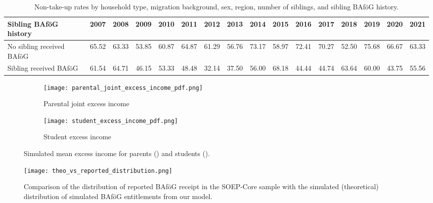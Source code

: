 \begin{landscape}
\begin{table}[htbp]
\begin{tabular}{lccccccccccccccc}
\midrule
Sibling BAföG history & 2007 & 2008 & 2009 & 2010 & 2011 & 2012 & 2013 & 2014 & 2015 & 2016 & 2017 & 2018 & 2019 & 2020 & 2021 \\
\midrule
No sibling received BAföG & 65.52 & 63.33 & 53.85 & 60.87 & 64.87 & 61.29 & 56.76 & 73.17 & 58.97 & 72.41 & 70.27 & 52.50 & 75.68 & 66.67 & 63.33 \\
Sibling received BAföG    & 61.54 & 64.71 & 46.15 & 53.33 & 48.48 & 32.14 & 37.50 & 56.00 & 68.18 & 44.44 & 44.74 & 63.64 & 60.00 & 43.75 & 55.56 \\
\bottomrule
\end{tabular}
\caption{Non-take-up rates by household type, migration background, sex, region, number of siblings, and sibling BAföG history.}
\end{table}
\end{landscape}


\begin{figure}[htbp]
  \centering
  \begin{subfigure}[t]{0.48\linewidth}
    \texttt{[image: parental\_joint\_excess\_income\_pdf.png]}
    \caption{Parental joint excess income}
    \label{fig:parental-excess}
  \end{subfigure}
  \hfill
  \begin{subfigure}[t]{0.48\linewidth}
    \texttt{[image: student\_excess\_income\_pdf.png]}
    \caption{Student excess income}
    \label{fig:student-excess}
  \end{subfigure}
  \caption{Simulated mean excess income for parents () and students ().}
  \label{fig:excess-income}
\end{figure}


\begin{figure}[htbp]
  \centering
  \texttt{[image: theo\_vs\_reported\_distribution.png]}
  \caption{Comparison of the distribution of reported BAföG receipt in the SOEP-Core sample with the simulated (theoretical) distribution of simulated BAföG entitlements from our model.}
  \label{fig:theo-vs-reported}
\end{figure}
